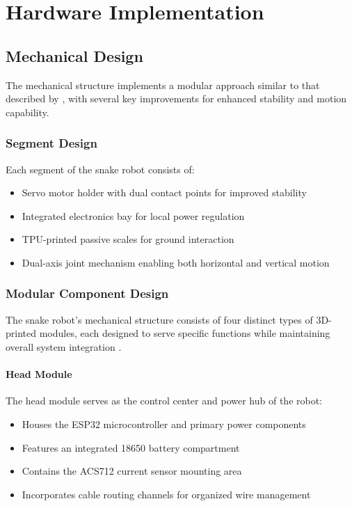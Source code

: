 \documentclass[12pt,a4paper]{report}
\begin{document}
\section{Hardware Implementation}
\subsection{Mechanical Design}
The mechanical structure implements a modular approach similar to that described by \cite{wang-2016}, with several key improvements for enhanced stability and motion capability.
\subsubsection{Segment Design}
Each segment of the snake robot consists of:
\begin{itemize}
    \item Servo motor holder with dual contact points for improved stability
    \item Integrated electronics bay for local power regulation
    \item TPU-printed passive scales for ground interaction
    \item Dual-axis joint mechanism enabling both horizontal and vertical motion

\end{itemize}
\subsubsection{Modular Component Design}
The snake robot's mechanical structure consists of four distinct types of 3D-printed modules, each designed to serve specific functions while maintaining overall system integration \cite{Mohammed2016}. 

\paragraph{Head Module}
The head module serves as the control center and power hub of the robot:
\begin{itemize}
    \item Houses the ESP32 microcontroller and primary power components
    \item Features an integrated 18650 battery compartment
    \item Contains the ACS712 current sensor mounting area
    \item Incorporates cable routing channels for organized wire management
\end{itemize}
\end{document}
